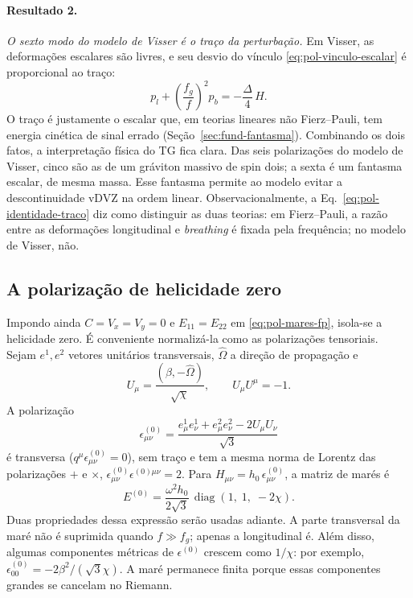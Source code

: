 \paragraph{Resultado 2.} \emph{O sexto modo do modelo de Visser é o
traço da perturbação.} Em Visser, as deformações escalares são livres,
e seu desvio do vínculo \eqref{eq:pol-vinculo-escalar} é proporcional
ao traço:
\begin{equation}
 p_l+\left(\frac{f_g}{f}\right)^2p_b=-\frac{\Delta}{4}\,H .
 \label{eq:pol-identidade-traco}
\end{equation}
O traço é justamente o escalar que, em teorias lineares não
Fierz--Pauli, tem energia cinética de sinal errado
(Seção~\ref{sec:fund-fantasma}). Combinando os dois fatos, a interpretação física do
TG fica clara. Das seis polarizações do modelo de Visser, cinco são as
de um gráviton massivo de spin dois; a sexta é um fantasma escalar, de
mesma massa. Esse fantasma permite ao modelo evitar a descontinuidade
vDVZ na ordem linear. Observacionalmente, a
Eq.~\eqref{eq:pol-identidade-traco} diz como distinguir as duas teorias:
em Fierz--Pauli, a razão entre as deformações longitudinal e
\emph{breathing} é fixada pela frequência; no modelo de Visser, não.

\subsection{A polarização de helicidade zero}

Impondo ainda $C=V_x=V_y=0$ e $E_{11}=E_{22}$ em
\eqref{eq:pol-mares-fp}, isola-se a helicidade zero. É conveniente
normalizá-la como as polarizações tensoriais. Sejam $e^1,e^2$ vetores
unitários transversais, $\hat\Omega$ a direção de propagação e
\begin{equation}
 U_\mu=\frac{(\beta,-\hat\Omega)}{\sqrt\chi},
 \qquad U_\mu U^\mu=-1.
 \label{eq:pol-U}
\end{equation}
A polarização
\begin{equation}
 \epsilon^{(0)}_{\mu\nu}=\frac{e^1_\mu e^1_\nu+e^2_\mu e^2_\nu
 -2U_\mu U_\nu}{\sqrt3}
 \label{eq:pol-helicidade-zero}
\end{equation}
é transversa ($q^\mu\epsilon^{(0)}_{\mu\nu}=0$), sem traço e tem a mesma
norma de Lorentz das polarizações $+$ e $\times$,
$\epsilon^{(0)}_{\mu\nu}\epsilon^{(0)\mu\nu}=2$. Para
$H_{\mu\nu}=h_0\,\epsilon^{(0)}_{\mu\nu}$, a matriz de marés é
\begin{equation}
 E^{(0)}=\frac{\omega^2h_0}{2\sqrt3}\,
 \operatorname{diag}\left(1,\;1,\;-2\chi\right).
 \label{eq:pol-mares-h0}
\end{equation}
Duas propriedades dessa expressão serão usadas adiante. A parte
transversal da maré não é suprimida quando $f\gg f_g$; apenas a
longitudinal é. Além disso, algumas componentes métricas de
$\epsilon^{(0)}$ crescem como $1/\chi$: por exemplo,
$\epsilon^{(0)}_{00}=-2\beta^2/(\sqrt3\chi)$. A maré permanece finita
porque essas componentes grandes se cancelam no Riemann.


